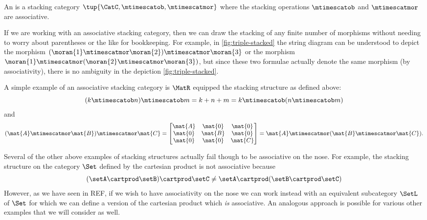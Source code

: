 \begin{ctdefinition}
    \label{def:strict-assoc-stacking-cat}
    An  is a stacking category $\tup{\CatC, \mtimescatob, \mtimescatmor}$ where the stacking operations $\mtimescatob$ and $\mtimescatmor$ are associative.
\end{ctdefinition}

If we are working with an associative stacking category, then we can draw the stacking of any finite number of morphisms without needing to worry about parentheses or the like for bookkeeping. For example, in \cref{fig:triple-stacked} the string diagram can be understood to depict the morphism $(\moran{1}\mtimescatmor \moran{2})\mtimescatmor \moran{3}$ or the morphism $\moran{1}\mtimescatmor (\moran{2}\mtimescatmor \moran{3})$, but since these two formulae actually denote the same morphism (by associativity), there is no ambiguity in the depiction \cref{fig:triple-stacked}. 

\begin{marginfigure}
    \centering
    \caption{Our string diagram notation for a triple stack.}
    \label{fig:triple-stacked}
\end{marginfigure}


A simple example of an associative stacking category is $\MatR$ equipped the stacking structure as defined above:
\begin{equation}
        (k \mtimescatob n) \mtimescatob m = k + n + m = k \mtimescatob (n \mtimescatob m)
\end{equation}
and 
\begin{equation}
(\mat{A} \mtimescatmor \mat{B}) \mtimescatmor \mat{C} = \begin{bmatrix} \mat{A} & \mat{0} & \mat{0} \\ \mat{0} & \mat{B} & \mat{0} \\
\mat{0} & \mat{0} & \mat{C} \end{bmatrix} = \mat{A} \mtimescatmor (\mat{B} \mtimescatmor \mat{C}).
\end{equation}

Several of the other above examples of stacking structures actually fail though to be associative on the nose. For example, the stacking structure on the category $\Set$ defined by the cartesian product is not associative because
\begin{equation}
(\setA \cartprod \setB) \cartprod \setC \neq \setA \cartprod (\setB \cartprod \setC)
\end{equation}
However, as we have seen in REF,  if we wish to have associativity on the nose we can work instead with an equivalent subcategory $\SetL$ of $\Set$ for which we can define a version of the cartesian product which \emph{is} associative. An analogous approach is possible for various other examples that we will consider as well. 

